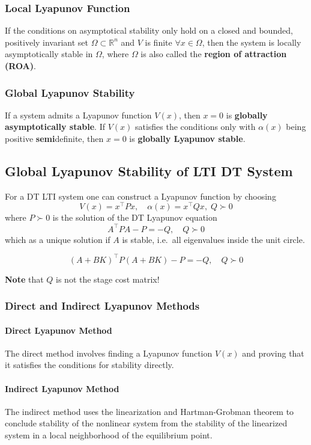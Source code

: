 \subsubsection{Local Lyapunov Function}
If the conditions on asymptotical stability only hold on a closed and bounded, positively invariant set $\Omega \subset \mathbb{R}^n$ and $V$ is finite $\forall x \in \Omega$, then the system is locally asymptotically stable in $\Omega$, where $\Omega$ is also called the \textbf{region of attraction (ROA)}.

\subsubsection{Global Lyapunov Stability}
If a system admits a Lyapunov function $V(x)$, then $x=0$ is \textbf{globally asymptotically stable}.
\newpar{}
If $V(x)$ satisfies the conditions only with $\alpha(x)$ being positive \textbf{semi}definite, then $x=0$ is \textbf{globally Lyapunov stable}.

\subsection{Global Lyapunov Stability of LTI DT System}
For a DT LTI system one can construct a Lyapunov function by choosing
\begin{equation*}
    V(x) = x^\top Px,\quad \alpha(x) = x^\top Q x, \;Q \succ 0
\end{equation*}
where $P\succ0$ is the solution of the DT Lyapunov equation
\begin{equation*}
    A^\top PA -P = -Q, \quad Q \succ 0
\end{equation*}
which as a unique solution if $A$ is stable, i.e.\ all eigenvalues inside the unit circle.

\newpar{}
\begin{equation*}
    {(A+BK)}^\top P{(A+BK)} -P = -Q, \quad Q\succ 0
\end{equation*}

\textbf{Note} that $Q$ is not the stage cost matrix!

\subsubsection{Direct and Indirect Lyapunov Methods}
\paragraph{Direct Lyapunov Method}
The direct method involves finding a Lyapunov function $V(x)$ and proving that it satisfies the conditions for stability directly.

\paragraph{Indirect Lyapunov Method}
The indirect method uses the linearization and Hartman-Grobman theorem to conclude stability of the nonlinear system from the stability of the linearized system in a local neighborhood of the equilibrium point.